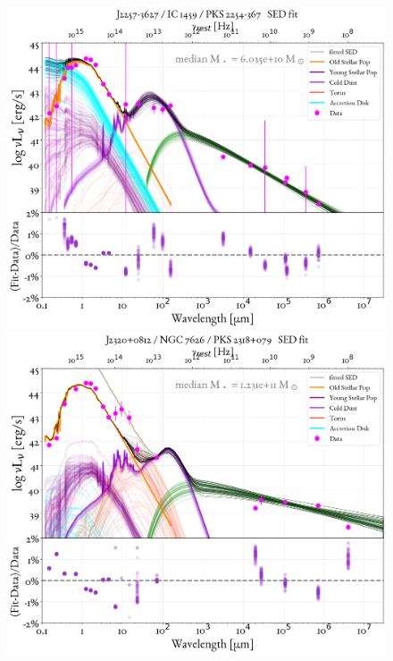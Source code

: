 \begin{figure}
    \centering
    \includegraphics[width=0.85\linewidth]{figures/ResultFits/82_SEDfit_5061.png}\\
    \includegraphics[width=0.85\linewidth]{figures/ResultFits/83_SEDfit_5120.png}   
\end{figure}

